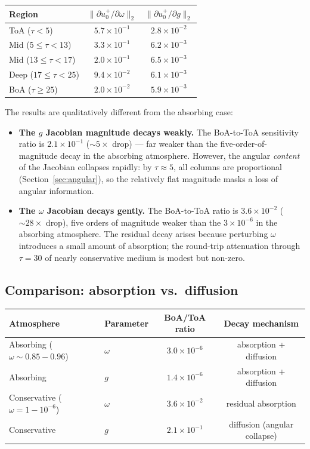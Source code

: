 \documentclass[11pt]{article}
\newcommand{\norm}[1]{\lVert #1 \rVert}
\begin{document}
\begin{center}
\begin{tabular}{l c c}
\toprule
Region & $\norm{\partial u^+_0/\partial\omega}_2$
       & $\norm{\partial u^+_0/\partial g}_2$\\
\midrule
ToA ($\tau<5$)       & $5.7\times10^{-1}$ & $2.8\times10^{-2}$\\
Mid ($5\!\leq\!\tau\!<\!13$) & $3.3\times10^{-1}$ & $6.2\times10^{-3}$\\
Mid ($13\!\leq\!\tau\!<\!17$) & $2.0\times10^{-1}$ & $6.5\times10^{-3}$\\
Deep ($17\!\leq\!\tau\!<\!25$) & $9.4\times10^{-2}$ & $6.1\times10^{-3}$\\
BoA ($\tau\geq 25$)  & $2.0\times10^{-2}$ & $5.9\times10^{-3}$\\
\bottomrule
\end{tabular}
\end{center}

The results are qualitatively different from the absorbing case:

\begin{itemize}
\item \textbf{The $g$ Jacobian magnitude decays weakly.}
  The BoA-to-ToA sensitivity ratio is $2.1\times10^{-1}$
  (${\sim}5\times$ drop) --- far weaker than the
  five-order-of-magnitude decay in the absorbing atmosphere.
  However, the angular \emph{content} of the Jacobian collapses
  rapidly: by $\tau\approx 5$, all columns are proportional
  (Section~\ref{sec:angular}), so the relatively flat magnitude
  masks a loss of angular information.

\item \textbf{The $\omega$ Jacobian decays gently.}
  The BoA-to-ToA ratio is $3.6\times10^{-2}$
  (${\sim}28\times$ drop), five orders of magnitude weaker
  than the $3\times10^{-6}$ in the absorbing atmosphere.
  The residual decay arises because perturbing $\omega$
  introduces a small amount of absorption; the round-trip
  attenuation through $\tau=30$ of nearly conservative medium
  is modest but non-zero.
\end{itemize}

\subsection{Comparison: absorption vs.\ diffusion}

\begin{center}
\begin{tabular}{l l c c}
\toprule
Atmosphere & Parameter & BoA/ToA ratio & Decay mechanism\\
\midrule
Absorbing ($\omega\!\sim\!0.85{-}0.96$) & $\omega$
  & $3.0\times10^{-6}$ & absorption + diffusion\\
Absorbing & $g$
  & $1.4\times10^{-6}$ & absorption + diffusion\\[3pt]
Conservative ($\omega\!=\!1{-}10^{-6}$) & $\omega$
  & $3.6\times10^{-2}$ & residual absorption\\
Conservative & $g$
  & $2.1\times10^{-1}$ & diffusion (angular collapse)\\
\bottomrule
\end{tabular}
\end{center}
\end{document}
